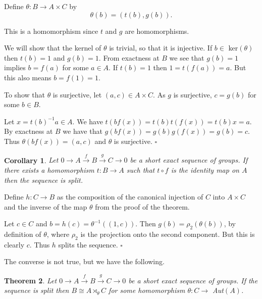 \documentclass[10pt]{article}
\newtheorem{theorem}{Theorem}[section]
\newtheorem{corollary}[theorem]{Corollary}
\newenvironment{proof}[1][Proof]{\begin{trivlist}
\item[\hskip \labelsep {\itshape #1}]}{\end{trivlist}}
\begin{document}
\begin{proof}
Define $\theta : B \to A\times C$ by
$$\theta(b) = (t(b), g(b)).$$

This is a homomorphism since $t$ and $g$ are homomorphisms.

We will show that the kernel of $\theta$ is trivial, so that it is injective. If $b \in$ ker$(\theta)$ then $t(b) = 1$ and $g(b) = 1$. From exactness at $B$ we see that $g(b) = 1$ implies $b = f(a)$ for some $a \in A$. If $t(b) = 1$ then $1 = t(f(a)) = a$. But this also means $b = f(1) = 1$.

To show that $\theta$ is surjective, let $(a, c) \in A\times C$. As $g$ is surjective, $c = g(b)$ for some $b \in B$.

Let $x = t(b)^{-1}a \in A$. We have $t(bf(x)) = t(b)t(f(x)) = t(b)x = a$. By exactness at $B$ we have that $g(bf(x)) = g(b)g(f(x)) = g(b) = c$. Thus $\theta(bf(x)) = (a, c)$ and $\theta$ is surjective. $\square$
\end{proof}

\begin{corollary}
Let $0 \longrightarrow A \overset{f}{\longrightarrow} B \overset{g}{\longrightarrow} C \longrightarrow 0$ be a short exact sequence of groups. If there exists a homomorphism $t : B \to A$ such that $t\circ f$ is the identity map on $A$ then the sequence is split.
\end{corollary}

\begin{proof}
Define $h : C \to B$ as the composition of the canonical injection of $C$ into $A\times C$ and the inverse of the map $\theta$ from the proof of the theorem.

Let $c \in C$ and $b = h(c) = \theta^{-1}((1, c))$. Then $g(b) = \rho_2(\theta(b))$, by definition of $\theta$, where $\rho_2$ is the projection onto the second component. But this is clearly $c$. Thus $h$ splits the sequence. $\square$
\end{proof}

The converse is not true, but we have the following.

\begin{theorem}
Let $0 \longrightarrow A \overset{f}{\longrightarrow} B \overset{g}{\longrightarrow} C \longrightarrow 0$ be a short exact sequence of groups. If the sequence is split then $B \cong A\rtimes_{\theta} C$ for some homomorphism $\theta : C \to$ Aut$(A)$.
\end{theorem}
\end{document}
